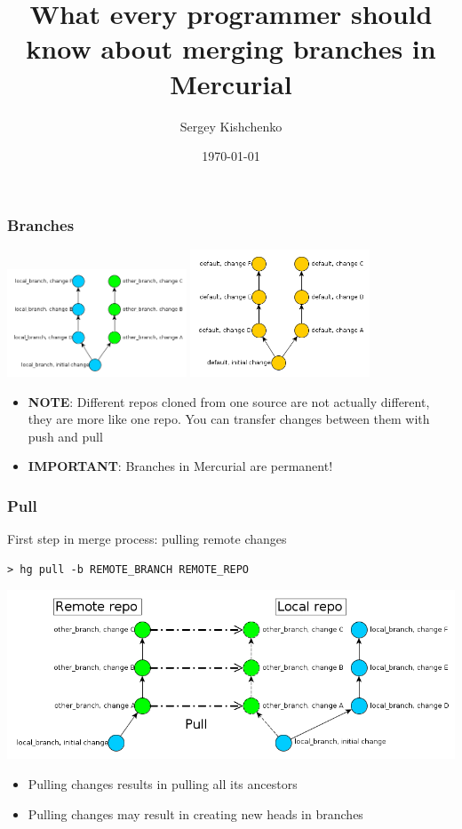 \documentclass{beamer}
\title{What every programmer should know about merging branches in Mercurial}
\author{Sergey Kishchenko}
\date{\today}
\institute{DoctorMobile}
\begin{document}
\frame{\titlepage}

\begin{frame} 
\frametitle{Branches}
\begin{multicols}{2}
\includegraphics[width=0.4\textwidth]{img/two_branches}
\columnbreak
{}
\includegraphics[width=0.4\textwidth]{img/two_default_branches}
\end{multicols}
\begin{itemize}
\item \textbf{NOTE}: Different repos cloned from one source are not actually different, they are more like one repo. You can transfer changes between them with push and pull
\item \textbf{IMPORTANT}: Branches in Mercurial are permanent!
\end{itemize}
\end{frame}

\begin{frame}[fragile]
\frametitle{Pull}
\begin{exampleblock}{First step in merge process: pulling remote changes}
\begin{verbatim}
> hg pull -b REMOTE_BRANCH REMOTE_REPO
\end{verbatim}
\end{exampleblock}
\includegraphics[width=\textwidth]{img/pull_branches}
\begin{itemize}
\item Pulling changes results in pulling all its ancestors
\item Pulling changes may result in creating new heads in branches 
\end{itemize}
\end{frame}
\end{document}
